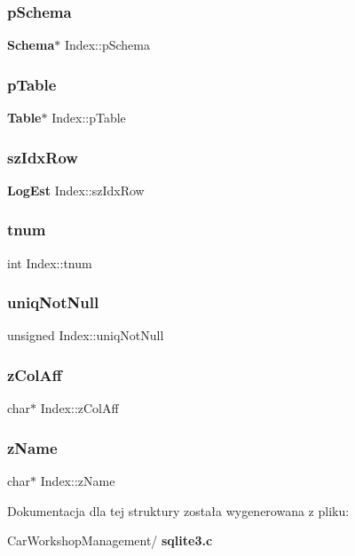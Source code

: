 \mbox{\label{struct_index_af14f5ddd57eab2aba63dcb5db2aa92af}} 
\subsubsection{pSchema}
{\footnotesize\ttfamily \textbf{ Schema}$\ast$ Index\+::p\+Schema}

\mbox{\label{struct_index_a01c6d4da27cba325ca58f333f87a6f44}} 
\subsubsection{pTable}
{\footnotesize\ttfamily \textbf{ Table}$\ast$ Index\+::p\+Table}

\mbox{\label{struct_index_a9048746be17e02ffb3ac6d6a228e4a62}} 
\subsubsection{szIdxRow}
{\footnotesize\ttfamily \textbf{ Log\+Est} Index\+::sz\+Idx\+Row}

\mbox{\label{struct_index_af895a09c01701021c3e36362c04a1ae6}} 
\subsubsection{tnum}
{\footnotesize\ttfamily int Index\+::tnum}

\mbox{\label{struct_index_a541590f6cf6c45705b3ef19fdce091ca}} 
\subsubsection{uniqNotNull}
{\footnotesize\ttfamily unsigned Index\+::uniq\+Not\+Null}

\mbox{\label{struct_index_af076df9f74dd836001c0a59d27274c0e}} 
\subsubsection{zColAff}
{\footnotesize\ttfamily char$\ast$ Index\+::z\+Col\+Aff}

\mbox{\label{struct_index_a8848cddf6e09f22e3b794ec019082ced}} 
\subsubsection{zName}
{\footnotesize\ttfamily char$\ast$ Index\+::z\+Name}



Dokumentacja dla tej struktury została wygenerowana z pliku\+:\begin{DoxyCompactItemize}
\item 
Car\+Workshop\+Management/\textbf{ sqlite3.\+c}\end{DoxyCompactItemize}
